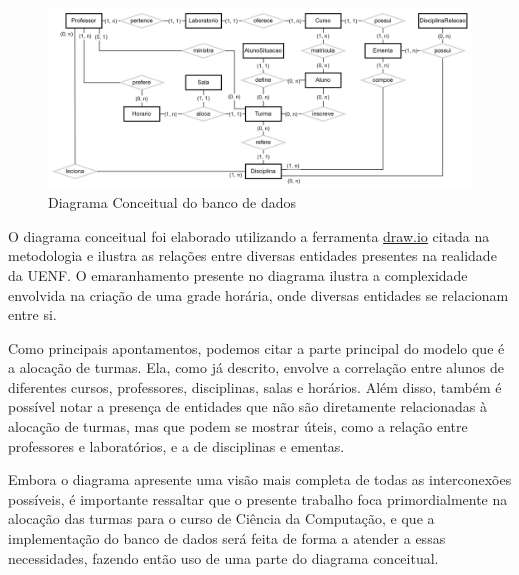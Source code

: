\begin{figure}[htbp]\centering
  \caption{\label{fig:DiagramConceitual} Diagrama Conceitual do banco de dados}
  \includegraphics[scale=0.2]{files/img/DiagramaConceitual/DiagramaConceitualBranco.png}
  \legend{\selfAuthor}
\end{figure} %

O diagrama conceitual foi elaborado utilizando a ferramenta \href{https://www.drawio.com/}{draw.io} citada na metodologia e ilustra as relações entre diversas entidades presentes na realidade da UENF. O emaranhamento presente no diagrama ilustra a complexidade envolvida na criação de uma grade horária, onde diversas entidades se relacionam entre si.

Como principais apontamentos, podemos citar a parte principal do modelo que é a alocação de turmas. Ela, como já descrito, envolve a correlação entre alunos de diferentes cursos, professores, disciplinas, salas e horários. Além disso, também é possível notar a presença de entidades que não são diretamente relacionadas à alocação de turmas, mas que podem se mostrar úteis, como a relação entre professores e laboratórios, e a de disciplinas e ementas.

Embora o diagrama apresente uma visão mais completa de todas as interconexões possíveis, é importante ressaltar que o presente trabalho foca primordialmente na alocação das turmas para o curso de Ciência da Computação, e que a implementação do banco de dados será feita de forma a atender a essas necessidades, fazendo então uso de uma parte do diagrama conceitual.



